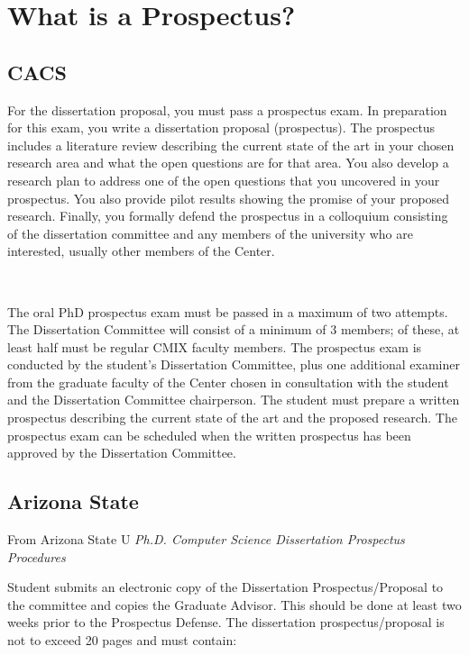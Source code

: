 \section{What is a Prospectus?}

\subsection{CACS}

For the dissertation proposal, you must pass a prospectus exam. In preparation for this exam, you write a dissertation proposal (prospectus). The prospectus includes a literature review describing the current state of the art in your chosen research area and what the open questions are for that area. You also develop a research plan to address one of the open questions that you uncovered in your prospectus. You also provide pilot results showing the promise of your proposed research. Finally, you formally defend the prospectus in a colloquium consisting of the dissertation committee and any members of the university who are interested, usually other members of the Center.

\

The oral PhD prospectus exam must be passed in a maximum of two attempts. The Dissertation
Committee will consist of a minimum of 3 members; of these, at least half must
be regular CMIX faculty members. The prospectus exam is conducted by the student’s Dissertation
Committee, plus one additional examiner from the graduate faculty of the Center
chosen in consultation with the student and the Dissertation Committee chairperson. The
student must prepare a written prospectus describing the current state of the art and the proposed
research. The prospectus exam can be scheduled when the written prospectus has been
approved by the Dissertation Committee.

\subsection{Arizona State}

From Arizona State U {\it Ph.D. Computer Science Dissertation Prospectus Procedures}


Student submits an electronic copy of the Dissertation Prospectus/Proposal to the committee and copies the Graduate Advisor. This should be done at least two weeks prior to the Prospectus Defense. The dissertation prospectus/proposal is not to exceed 20 pages and must contain:

